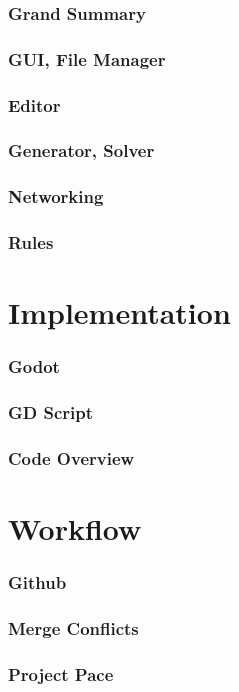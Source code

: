 \documentclass{beamer}
\begin{document}
\begin{frame}
    \frametitle{Grand Summary} %
\end{frame}


\begin{frame}
    \frametitle{GUI, File Manager} %
\end{frame}

\begin{frame}
    \frametitle{Editor} %
\end{frame}

\begin{frame}
    \frametitle{Generator, Solver} %
\end{frame}

\begin{frame}
    \frametitle{Networking} %
\end{frame}

\begin{frame}
    \frametitle{Rules} %
\end{frame}


\section{Implementation}
\begin{frame}
    \frametitle{Godot} %
\end{frame}

\begin{frame}
    \frametitle{GD Script} %
\end{frame}

\begin{frame}
    \frametitle{Code Overview} %
\end{frame}


\section{Workflow} %
\begin{frame}
    \frametitle{Github} 
\end{frame}

\begin{frame}
    \frametitle{Merge Conflicts} 
\end{frame}

\begin{frame}
    \frametitle{Project Pace} %
\end{frame}
\end{document}
